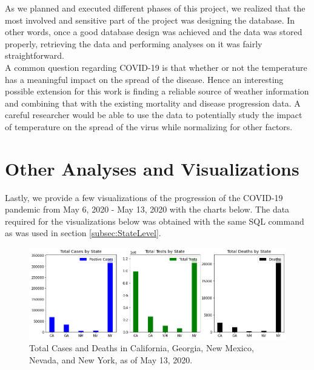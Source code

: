 \documentclass[11pt]{article}
\begin{document}
\noindent
As we planned and executed different phases of this project, we realized that the most involved and sensitive part of the project was designing the database. In other words, once a good database design was achieved and the data was stored properly, retrieving the data and performing analyses on it was fairly straightforward.\\

\noindent
 A common question regarding COVID-19 is that whether or not the temperature has a meaningful impact on the spread of the disease. Hence an interesting possible extension for this work is finding a reliable source of weather information and combining that with the existing mortality and disease progression data. A careful researcher would be able to use the data to potentially study the impact of temperature on the spread of the virus while normalizing for other factors.

\pagebreak




\pagebreak

\appendix

\section{Other Analyses and Visualizations}

\noindent
Lastly, we provide a few visualizations of the progression of the COVID-19 pandemic from May 6, 2020 - May 13, 2020 with the charts below. The data required for the visualizations below was obtained with the same SQL command as was used in section \ref{subsec:StateLevel}.

\FloatBarrier
\begin{figure}[h]
    \centering
    \includegraphics[width=\linewidth]{diagrams/analysis/total_cases_bar.png}
    \caption{Total Cases and Deaths in California, Georgia, New Mexico, Nevada, and New York, as of May 13, 2020.}
    \label{fig:overall}
\end{figure}
\FloatBarrier
\end{document}
